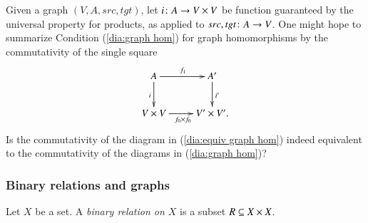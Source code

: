 \begin{exercise}\label{exc:single condition for graph hom}

Given a graph $(V,A,src,tgt)$, let $i\taking A\to V\times V$ be function guaranteed by the universal property for products, as applied to $src,tgt\taking A\to V$. One might hope to summarize Condition (\ref{dia:graph hom}) for graph homomorphisms by the commutativity of the single square 
\begin{align}\label{dia:equiv graph hom}
\xymatrix{A\ar[r]^{f_1}\ar[d]_{i}&A'\ar[d]^{i'}\\V\times V\ar[r]_{f_0\times f_0}&V'\times V'.}
\end{align}
Is the commutativity of the diagram in (\ref{dia:equiv graph hom}) indeed equivalent to the commutativity of the diagrams in (\ref{dia:graph hom})?
\end{exercise}


\subsubsection{Binary relations and graphs}

\begin{definition}\label{def:binary relation}

Let $X$ be a set. A {\em binary relation on $X$} is a subset $R\ss X\times X$. 

\end{definition}

